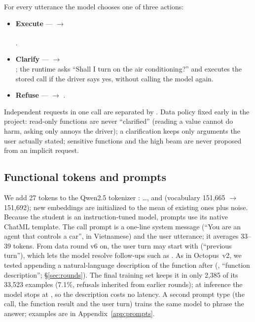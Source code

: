 For every utterance the model chooses one of three actions:
\begin{itemize}
  \item \textbf{Execute} ---  $\rightarrow$\\
  {\small{}\\ }.
  \item \textbf{Clarify} ---  $\rightarrow$\\
  {\small{}}; the runtime asks ``Shall I turn on the air
  conditioning?'' and executes the stored call if the driver says yes, without calling the model again.
  \item \textbf{Refuse} ---  $\rightarrow$
  {\small{}\code{()}}.
\end{itemize}
Independent requests in one call are separated by \code{;}. Data policy fixed early in the project: read-only functions are
never ``clarified'' (reading a value cannot do harm, asking only annoys the driver); a clarification keeps only arguments the
user actually stated; sensitive functions and the high beam are never proposed from an implicit request.

\subsection{Functional tokens and prompts}
\label{sec:tokens}

We add 27 tokens to the Qwen2.5 tokenizer \citep{qwen2024qwen25}: \ldots{},  and
 (vocabulary 151,665 $\rightarrow$ 151,692); new embeddings are initialized to the mean of existing ones plus
noise. Because the student is an instruction-tuned model, prompts use its native ChatML template. The call prompt is a
one-line system message (``You are an agent that controls a car'', in Vietnamese) and the user utterance; it averages 33--39
tokens. From data round v6 on, the user turn may start with  (``previous turn''), which lets
the model resolve follow-ups such as . As in Octopus~v2, we tested appending a natural-language
description of the function after  (, ``function description''; \S\ref{sec:rounds}).
The final training set keeps it in only 2,385 of its 33,523 examples (7.1\%, refusals inherited from earlier rounds);
at inference the model stops at , so the description costs no latency. A second prompt type (the call, the function result and
the user turn) trains the same model to phrase the answer; examples are in Appendix~\ref{app:prompts}.

